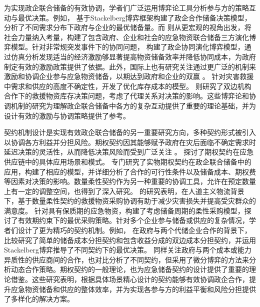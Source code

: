 \documentclass[a4paper,8pt,twocolumn]{article} %
\begin{document}
为实现政企联合储备的有效协调，学者们广泛运用博弈论工具分析参与方的策略互动与最优决策。例如，\parencite{Li2022Stackelberg} 基于Stackelberg博弈框架构建了政企合作储备决策模型，分析了不同需求分布下政府与企业的最优储备量。而 \parencite{Zhang2022Evolutionary} 则从更宏观的视角出发，将社会力量纳入考量，构建了包含政府、企业和社会的应急物资联合储备三方演化博弈模型。针对非常规突发事件下的协同问题，\parencite{shao2023非常规突发事件} 构建了政企协同演化博弈模型，通过仿真分析发现适当的经济激励够显著提高物资储备效率并降低协同成本，为政府制定有效的激励政策提供了依据。此外，国际上也有研究关注通过更广泛的机制来激励和协调企业参与应急物资储备，以期达到政府和企业的双赢 \cite{egan2010private, balcik2010coordination, vanwyk2011modeling, coskun2019relief}。\parencite{vanwyk2011modeling} 针对灾害救援中需求和供应的高度不确定性，开发了优化库存成本的模型。\parencite{coskun2019relief} 则研究了双边机构合作下的救援物资库存决策问题，考虑了代理关系对决策的影响。这些博弈论和协调机制的研究为理解政企联合储备中各方的复杂互动提供了重要的理论基础，并为设计有效的激励与协调策略提供了参考。

契约机制设计是实现有效政企联合储备的另一重要研究方向，多种契约形式被引入以协调各方利益并分担风险。期权契约因其能够赋予政府在灾后面临不确定需求时延迟决策的灵活性，从而降低决策风险而受到广泛关注 \cite{rabbani2015option, wang2015prepurchasing}。\parencite{rabbani2015option} 探讨了期权契约在应急供应链中的具体应用场景和模式。\parencite{Pang2020PhysicalOption} 专门研究了实物期权契约在政企联合储备中的应用，构建了相应的模型，并详细分析了合作的可行性条件以及储备成本、期权费等因素对决策的影响。数量柔性契约作为另一种重要的协调工具，允许在预定数量上有一定的调整空间，也得到了深入研究。\parencite{nikkhoo2018coordination} 的研究表明，在人道主义物流背景下，基于数量柔性契约的救援物资采购协调有助于减少灾害损失并提高受灾群众的满意度。\parencite{chai2021考虑储备周期} 针对具有保质期的应急物资，构建了考虑储备周期的柔性采购模型，探讨了有效期约束下的最优采购策略。针对多个企业参与储备或供应的复杂情况，学者们设计了更为精巧的契约机制。例如，\parencite{Chen2023Contract} 在政府与两个代储企业合作的背景下，比较研究了简单的储备成本分担契约和包含收益分成的双边成本分担契约，并运用Stackelberg博弈推导了不同契约下的最优决策。\parencite{Li2024CooperationStrategies} 同样关注政府与两个成本或能力异质性的供应商间的合作，也对比分析了不同契约，但采用了微分博弈的方法来分析动态合作策略。期权契约的一般理论\cite{black1973pricing, barnes2002coordination,xu2010managing}，也为应急储备契约的设计提供了重要的理论借鉴。这些研究表明，根据具体场景精心设计的契约能够有效协调政企合作，提升应急物资储备和供应的整体效率，并为实现各参与方的利益平衡和风险分担提供了多样化的解决方案。
\end{document}
